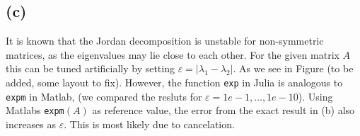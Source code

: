 \subsection*{(c)}
It is known that the Jordan decomposition is unstable for non-symmetric matrices, as the eigenvalues may lie close to each other. For the given matrix $A$ this can be tuned artificially by setting $\varepsilon=|\lambda_{1}-\lambda_{2}|$. As we see in Figure (to be added, some layout to fix). However, the function \texttt{exp} in Julia is analogous to \texttt{expm} in Matlab, (we compared the resluts for $\varepsilon = 1e-1,\ldots,1e-10$). Using Matlabs \texttt{expm}$(A)$ as reference value, the error from the exact result in (b) also increases as $\varepsilon$. This is most likely due to cancelation.
